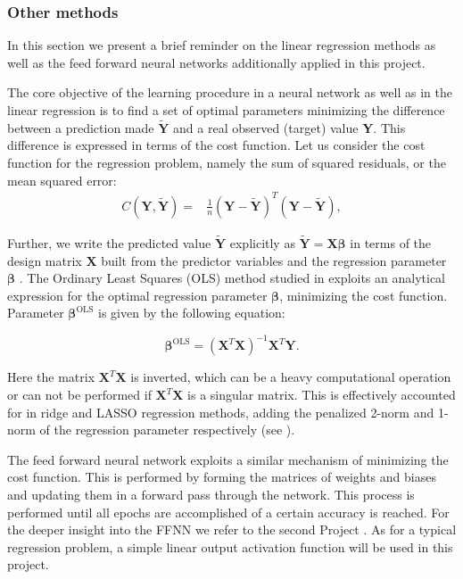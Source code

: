 \documentclass[numberedappendix, twocolappendix]{emulateapj}
\begin{document}
\subsubsection{Other methods}\label{sec: Other methods}

In this section we present a brief reminder on the linear regression methods as well as the feed forward neural networks additionally applied in this project. 

The core objective of the learning procedure in a neural network as well as in the linear regression is to find a set of optimal parameters minimizing the difference between a prediction made $\tilde{\textbf{Y}}$ and a real observed (target) value \textbf{Y}. This difference is expressed in terms of the cost function. Let us consider the cost function for the regression problem, namely the sum of squared residuals, or the mean squared error:
\begin{equation}
\begin{split}
      C(\textbf{Y},\tilde{\textbf{Y}})=&\frac{1}{n}(\textbf{Y}-\tilde{\textbf{Y}})^T(\textbf{Y}-\tilde{\textbf{Y}}),
\end{split}
\end{equation}

Further, we write the predicted value  $\tilde{\textbf{Y}}$ explicitly as $\tilde{\textbf{Y}}=\textbf{X}\boldsymbol{\beta}$ in terms of the design matrix $\textbf{X}$ built from the predictor variables and the regression parameter $\boldsymbol{\beta}$ \cite{Morten}. The Ordinary Least Squares (OLS) method studied in \cite{proj1_1,proj1_2} exploits an analytical expression for the optimal regression parameter $\boldsymbol{\beta}$, minimizing the cost function.  Parameter $\boldsymbol{\beta}^{\mathrm{OLS}}$ is given by the following equation:

\begin{equation}
    \boldsymbol{\beta}^{\mathrm{OLS}} = (\mathbf{X}^T \mathbf{X})^{-1} \mathbf{X}^T \mathbf{Y}.
    \label{eq:beta-ols}
\end{equation}

Here the matrix $\mathbf{X}^T\mathbf{X}$ is inverted, which can be a heavy computational operation or can not be performed if $\mathbf{X}^T\mathbf{X}$ is a singular matrix. This is effectively accounted for in ridge and LASSO regression methods, adding the penalized 2-norm and 1-norm of the regression parameter  \boldsymbol{\beta} respectively (see \cite{proj1_1,proj1_2}).

The feed forward neural network exploits a similar mechanism of minimizing the cost function. This is performed by forming the matrices of weights and biases and updating them in a forward pass through the network. This process is performed until all epochs are accomplished of a certain accuracy is reached. For the deeper insight into the FFNN we refer to the second Project \cite{proj2}. As for a typical regression problem, a simple linear output activation function will be used in this project.
\end{document}
